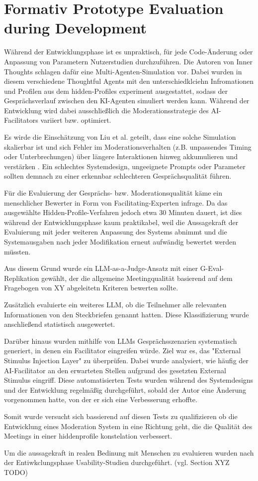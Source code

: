 \section{Formativ Prototype Evaluation during Development}

Während der Entwicklungsphase ist es unpraktisch, für jede Code-Änderung oder Anpassung von Parametern
Nutzerstudien durchzuführen. Die Autoren von Inner Thoughts schlagen dafür eine Multi-Agenten-Simulation vor.
\cite["6 Simulative Evaluation"]{liuProactiveConversationalAgents2025}
Dabei wurden in diesem verschiedene Thoughtful Agents mit den unterschiedklciehn Infromationen und Profilen
aus dem hidden-Profiles experiment ausgestattet, sodass der Gesprächsverlauf zwischen den KI-Agenten
simuliert werden kann. Während der Entwicklung wird dabei
ausschließlich die Moderationsstrategie des AI-Facilitators variiert bzw. optimiert.

Es wirde die Einschätzung von Liu et al. geteilt, dass eine solche Simulation skalierbar ist und sich
Fehler im Moderationsverhalten (z.B. unpassendes Timing oder Unterbrechungen) über längere Interaktionen
hinweg akkumulieren und verstärken \cite["6 Simulative Evaluation"]{liuProactiveConversationalAgents2025}.
Ein schlechtes Systemdesign, ungeeignete Prompts oder Parameter sollten demnach zu einer erkennbar
schlechteren Gesprächsqualität führen.

Für die Evaluierung der Gesprächs- bzw. Moderationsqualität käme ein menschlicher Bewerter in Form von
Facilitating-Experten infrage.
Da das ausgewählte Hidden-Profile-Verfahren jedoch etwa 30 Minuten dauert, ist dies während der
Entwicklungsphase kaum praktikabel, weil die Aussagekraft der Evaluierung mit jeder weiteren Anpassung des
Systems abnimmt und die Systemausgaben nach jeder Modifikation erneut aufwändig bewertet werden müssten.

Aus diesem Grund wurde ein LLM-as-a-Judge-Ansatz mit einer G-Eval-Replikation gewählt, der die allgemeine
Meetingqualität basierend auf dem Fragebogen von XY abgeleitetn Kriteren bewerten sollte.

Zusätzlich evaluierte ein weiteres LLM, ob die Teilnehmer alle relevanten Informationen von den Steckbriefen
genannt hatten. Diese Klassifizierung wurde anschließend statistisch ausgewertet.

Darüber hinaus wurden mithilfe von LLMs Gesprächsszenarien systematisch generiert, in denen ein Facilitator
eingreifen würde. Ziel war es, das "External Stimulus Injection Layer" zu überprüfen. Dabei wurde analysiert,
wie häufig der AI-Facilitator an den erwarteten Stellen aufgrund des gesetzten External Stimulus eingriff.
Diese automatisierten Tests wurden während des Systemdesigns und der Entwicklung regelmäßig durchgeführt,
sobald der Autor eine Änderung vorgenommen hatte, von der er sich eine Verbesserung erhoffte.

Somit wurde versucht sich bassierend auf diesen Tests zu qualifizieren ob die Entwicklung eines Moderation
System in eine Richtung geht, die die Qualität des Meetings in einer hiddenprofile konstelation verbessert.

Um die aussagekraft in realen Bedinung mit Menschen zu evaluieren wurden nach der Entiwkclungsphase
Usability-Studien durchgeführt.
(vgl. Section XYZ TODO)
